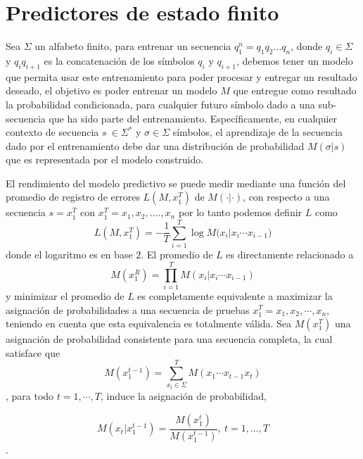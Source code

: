 \section{Predictores de estado finito}


 

Sea $\Sigma$ un alfabeto finito, para entrenar un secuencia $q_{1}^{n}=q_{1}q_{2} \dots q_{n}$, donde $q_{i} \in \Sigma$ y $q_{i}q_{i+1}$ es la concatenación de los símbolos $q_{i}$ y $q_{i+1}$, debemos tener un modelo que permita usar este entrenamiento para poder procesar y entregar un resultado deseado, el objetivo es poder entrenar un modelo $M$ que entregue como resultado la probabilidad condicionada, para cualquier futuro símbolo dado a una sub-secuencia que ha sido parte del entrenamiento.
Específicamente, en cualquier contexto de secuencia $s \ \in \Sigma^{*} $ y  $\sigma \in \Sigma$ símbolos, el aprendizaje de la secuencia dado por el entrenamiento debe dar una distribución de probabilidad $M(\sigma | s )$ que es representada por el modelo construido.

El rendimiento del modelo predictivo se puede medir mediante una función del promedio de registro de errores $L(M,x_{1}^{T})$ de $M (\cdot | \cdot )$, con respecto a una secuencia $s = x_{1}^{T}$ con $x_{1}^{T}= x_{1},x_{2},....,x_{n} $%
 por lo tanto podemos definir $L$ como \begin{equation} L( M , x_{1}^{T} ) = 
- \dfrac{1}{T} 
\sum _{i=1}^{T} \log{ M(x_{i} | x_{i} \cdots x_{i-1}} )\end{equation}
donde el logaritmo es en base $2$.  El promedio de $L$ es directamente relacionado a  \begin{equation}M(x_{1}^{R}) = \prod_{i=1}^{T} M(x_{i} | x_{i} \cdots x_{i-1} ) \end{equation} y minimizar el promedio de $L$ es completamente equivalente a maximizar la asignación de probabilidades a una secuencia de pruebas $x_{1}^{T}= x_{1},x_{2},\cdots,x_{n} $, teniendo en cuenta que esta equivalencia es totalmente válida. Sea $M(x_{1}^{T})$ una asignación de probabilidad consistente para una secuencia completa, la cual satisface que \begin{equation}
M(x_{1}^{t-1}) = \sum_{\mbox{$x_t$} \in \Sigma}^{T} M(x_{1} \cdots x_{t-1}x_{t} )
\end{equation}, para todo $t=1,\cdots,T$, induce la asignación de probabilidad,

\begin{equation}
M(x_{t} | x_{1}^{t-1} ) =  \dfrac{M(x_{1}^{t})}{M(x_{1}^{t-1} )},\ t=1,...,T 
\end{equation}.



